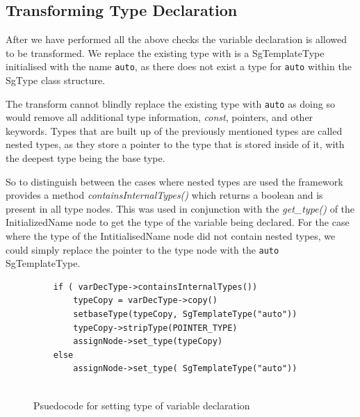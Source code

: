 \documentclass[bsc,frontabs,singlespacing,twoside,parskip,deptreport]{infthesis}
\begin{document}

\subsection{Transforming Type Declaration}
After we have performed all the above checks the variable declaration is allowed to be transformed. We replace the existing type with is a SgTemplateType initialised with the name \texttt{auto}, as there does not exist a type for \texttt{auto} within the SgType class structure. 

The transform cannot blindly replace the existing type with \texttt{auto} as doing so would remove all additional type information, \textit{const}, pointers, and other keywords. Types that are built up of the previously mentioned types are called nested types, as they store a pointer to the type that is stored inside of it, with the deepest type being the base type.

So to distinguish between the cases where nested types are used the framework provides a method \textit{containsInternalTypes()} which returns a boolean and is present in all type nodes. This was used in conjunction with the \textit{get\_type()} of the InitializedName node to get the type of the variable being declared. For the case where the type of the IntitialisedName node did not contain nested types, we could simply replace the pointer to the type node with the \texttt{auto} SgTemplateType. 

\begin{figure}[H]
    \centering
    \begin{verbatim}
    if ( varDecType->containsInternalTypes())
        typeCopy = varDecType->copy()
        setbaseType(typeCopy, SgTemplateType("auto"))
        typeCopy->stripType(POINTER_TYPE)
        assignNode->set_type(typeCopy)
    else
        assignNode->set_type( SgTemplateType("auto"))
    
    \end{verbatim}
    \caption{Psuedocode for setting type of variable declaration}
    \label{fig:auto-cases-nested-types}
\end{figure}
\end{document}
